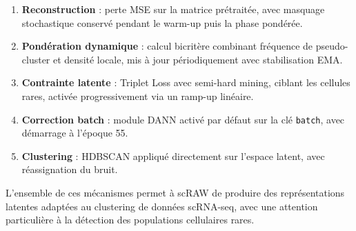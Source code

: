\documentclass[11pt,a4paper]{article}
\begin{document}
\begin{enumerate}[nosep]
  \item \textbf{Reconstruction} : perte MSE sur la matrice pr\'etrait\'ee, avec masquage stochastique conserv\'e pendant le warm-up puis la phase pond\'er\'ee.
  \item \textbf{Pond\'eration dynamique} : calcul bicrit\`ere combinant fr\'equence de pseudo-cluster et densit\'e locale, mis \`a jour p\'eriodiquement avec stabilisation EMA.
  \item \textbf{Contrainte latente} : Triplet Loss avec semi-hard mining, ciblant les cellules rares, activ\'ee progressivement via un ramp-up lin\'eaire.
  \item \textbf{Correction batch} : module DANN activ\'e par d\'efaut sur la cl\'e \texttt{batch}, avec d\'emarrage \`a l'\'epoque 55.
  \item \textbf{Clustering} : HDBSCAN appliqu\'e directement sur l'espace latent, avec r\'eassignation du bruit.
\end{enumerate}

L'ensemble de ces m\'ecanismes permet \`a scRAW de produire des repr\'esentations latentes adapt\'ees au clustering de donn\'ees scRNA-seq, avec une attention particuli\`ere \`a la d\'etection des populations cellulaires rares.
\end{document}
